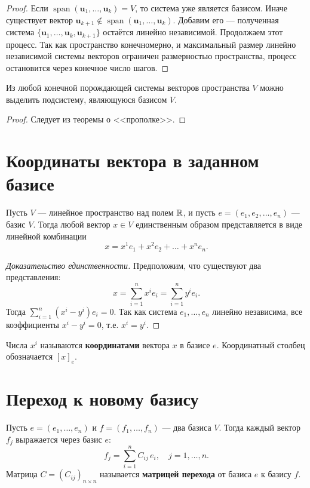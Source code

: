 \documentclass[10pt]{article}
\begin{document}
\begin{proof}
Если \(\operatorname{span}(\mathbf{u}_1,\dots,\mathbf{u}_k) = V\), то система уже является базисом. Иначе существует вектор \(\mathbf{u}_{k+1} \notin \operatorname{span}(\mathbf{u}_1,\dots,\mathbf{u}_k)\). Добавим его — полученная система \(\{\mathbf{u}_1,\dots,\mathbf{u}_k,\mathbf{u}_{k+1}\}\) остаётся линейно независимой. Продолжаем этот процесс. Так как пространство конечномерно, и максимальный размер линейно независимой системы векторов ограничен размерностью пространства, процесс остановится через конечное число шагов.
\end{proof}

\begin{theorem}
Из любой конечной порождающей системы векторов пространства \(V\) можно выделить подсистему, являющуюся базисом \(V\).
\end{theorem}

\begin{proof}
Следует из теоремы о <<прополке>>.
\end{proof}
\section{Координаты вектора в заданном базисе}

Пусть $V$ — линейное пространство над полем $\mathbb{R}$, и пусть $e = (e_1, e_2, \dots, e_n)$ — базис $V$. Тогда любой вектор $x \in V$ единственным образом представляется в виде линейной комбинации
\[
x = x^1 e_1 + x^2 e_2 + \dots + x^n e_n.
\]

\begin{proof}[Доказательство единственности]
Предположим, что существуют два представления:
\[
x = \sum_{i=1}^n x^i e_i = \sum_{i=1}^n y^i e_i.
\]
Тогда $\sum_{i=1}^n (x^i - y^i) e_i = 0$. Так как система $e_1,\dots,e_n$ линейно независима, все коэффициенты $x^i - y^i = 0$, т.е. $x^i = y^i$.
\end{proof}

Числа $x^i$ называются \textbf{координатами} вектора $x$ в базисе $e$. Координатный столбец обозначается $[x]_e$.

\section{Переход к новому базису}

Пусть $e = (e_1,\dots,e_n)$ и $f = (f_1,\dots,f_n)$ — два базиса $V$. Тогда каждый вектор $f_j$ выражается через базис $e$:
\[
f_j = \sum_{i=1}^n C_{ij}\, e_i, \quad j=1,\dots,n.
\]
Матрица $C = (C_{ij})_{n\times n}$ называется \textbf{матрицей перехода} от базиса $e$ к базису $f$.
\end{document}
